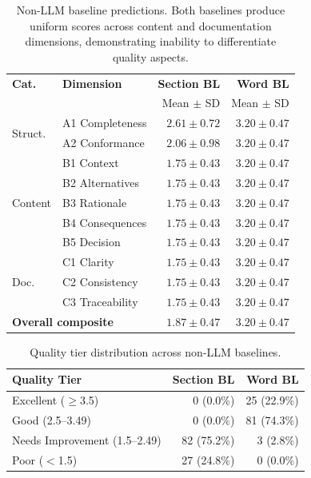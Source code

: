 \begin{table}[htbp]
\caption{Non-LLM baseline predictions. Both baselines produce uniform scores across content and documentation dimensions, demonstrating inability to differentiate quality aspects.}
\label{tab:baselines}
\centering
\begin{tabular}{llrr}
\toprule
\textbf{Cat.} & \textbf{Dimension} & \textbf{Section BL} & \textbf{Word BL} \\
 & & Mean $\pm$ SD & Mean $\pm$ SD \\
\midrule
\multirow{2}{*}{Struct.} & A1 Completeness & $2.61 \pm 0.72$ & $3.20 \pm 0.47$ \\
 & A2 Conformance & $2.06 \pm 0.98$ & $3.20 \pm 0.47$ \\
\midrule
\multirow{5}{*}{Content} & B1 Context & $1.75 \pm 0.43$ & $3.20 \pm 0.47$ \\
 & B2 Alternatives & $1.75 \pm 0.43$ & $3.20 \pm 0.47$ \\
 & B3 Rationale & $1.75 \pm 0.43$ & $3.20 \pm 0.47$ \\
 & B4 Consequences & $1.75 \pm 0.43$ & $3.20 \pm 0.47$ \\
 & B5 Decision & $1.75 \pm 0.43$ & $3.20 \pm 0.47$ \\
\midrule
\multirow{3}{*}{Doc.} & C1 Clarity & $1.75 \pm 0.43$ & $3.20 \pm 0.47$ \\
 & C2 Consistency & $1.75 \pm 0.43$ & $3.20 \pm 0.47$ \\
 & C3 Traceability & $1.75 \pm 0.43$ & $3.20 \pm 0.47$ \\
\midrule
\multicolumn{2}{l}{\textbf{Overall composite}} & $\mathbf{1.87 \pm 0.47}$ & $\mathbf{3.20 \pm 0.47}$ \\
\bottomrule
\end{tabular}
\end{table}


\begin{table}[htbp]
\caption{Quality tier distribution across non-LLM baselines.}
\label{tab:tiers}
\centering
\begin{tabular}{lrr}
\toprule
\textbf{Quality Tier} & \textbf{Section BL} & \textbf{Word BL} \\
\midrule
Excellent ($\geq$3.5) & 0 (0.0\%) & 25 (22.9\%) \\
Good (2.5--3.49) & 0 (0.0\%) & 81 (74.3\%) \\
Needs Improvement (1.5--2.49) & 82 (75.2\%) & 3 (2.8\%) \\
Poor ($<$1.5) & 27 (24.8\%) & 0 (0.0\%) \\
\bottomrule
\end{tabular}
\end{table}


